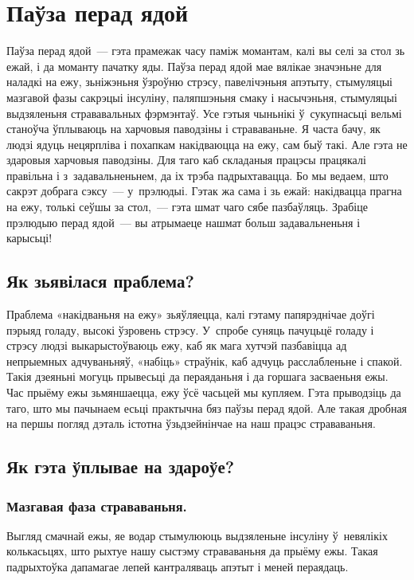 \chapter{Паўза перад ядой}

Паўза перад ядой~--- гэта прамежак часу паміж момантам, калі вы селі за стол зь ежай, і да моманту пачатку яды. Паўза перад ядой мае вялікае значэньне для наладкі на ежу, зьніжэньня ўзроўню стрэсу, павелічэньня апэтыту, стымуляцыі мазгавой фазы сакрэцыі інсуліну, паляпшэньня смаку і насычэньня, стымуляцыі выдзяленьня стрававальных фэрмэнтаў. Усе гэтыя чыньнікі ў~сукупнасьці вельмі станоўча ўплываюць на харчовыя паводзіны і страваваньне. Я часта бачу, як людзі ядуць нецярпліва і похапкам накідваюцца на ежу, сам быў такі. Але гэта не здаровыя харчовыя паводзіны. Для таго каб складаныя працэсы працякалі правільна і з~задавальненьнем, да іх трэба падрыхтавацца. Бо мы ведаем, што сакрэт добрага сэксу~--- у~прэлюдыі. Гэтак жа сама і зь ежай: накідвацца прагна на ежу, толькі сеўшы за стол,~--- гэта шмат чаго сябе пазбаўляць. Зрабіце прэлюдыю перад ядой~--- вы атрымаеце нашмат больш задавальненьня і карысьці!

\section{Як зьявілася праблема?}

Праблема «накідваньня на ежу» зьяўляецца, калі гэтаму папярэднічае доўгі пэрыяд голаду, высокі ўзровень стрэсу. У~спробе суняць пачуцьцё голаду і стрэсу людзі выкарыстоўваюць ежу, каб як мага хутчэй пазбавіцца ад непрыемных адчуваньняў, «набіць» страўнік, каб адчуць расслабленьне і спакой. Такія дзеяньні могуць прывесьці да пераяданьня і да горшага засваеньня ежы.
Час прыёму ежы зьмяншаецца, ежу ўсё часьцей мы купляем. Гэта прыводзіць да таго, што мы пачынаем есьці практычна бяз паўзы перад ядой. Але такая дробная на першы погляд дэталь істотна ўзьдзейнінчае на наш працэс страваваньня.

\section{Як гэта ўплывае на здароўе?}

\subsection{Мазгавая фаза страваваньня.}
Выгляд смачнай ежы, яе водар стымулююць выдзяленьне інсуліну ў~невялікіх колькасьцях, што рыхтуе нашу сыстэму страваваньня да прыёму ежы. Такая падрыхтоўка дапамагае лепей кантраляваць апэтыт і меней пераядаць.

